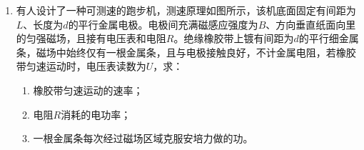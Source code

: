 \documentclass[\gkver]{gaokaozhenti}
\begin{document}
\begin{enumerate}
{$a=\frac{mg-\mu(M+m')g}{M+m+m'}=\frac{mg-\mu(M+m+m')g+\mu mg}{M+m+m'}=\frac{(1+\mu)g}{M+m+m'}m-\mu g$

若要求 $a$ 是 $m$ 的一次函数必须使 $\frac{(1+\mu)g}{M+m+m'}$ 不变，即使 $m+m'$ 不变，在增大 $m$ 时等量减小 $m'$，所以实验中应将从托盘中取出的砝码置于滑块上。

③将 $\frac{(1+\mu)g}{M+m+m'}$ 取为 $k$，有 $k=\frac{a_{1}+\mu g}{m_{1}}=\frac{a_{2}+\mu g}{m_{2}}$，在图像上取两点将坐标代入解得 $\mu=0.23$（在 0.21 到 0.25 之间是正确的）。
}

\item
有人设计了一种可测速的跑步机，测速原理如图所示，该机底面固定有间距为$L$、长度为$d$的平行金属电极。电极间充满磁感应强度为$B$、方向垂直纸面向里的匀强磁场，且接有电压表和电阻$R$。绝缘橡胶带上镀有间距为$d$的平行细金属条，磁场中始终仅有一根金属条，且与电极接触良好，不计金属电阻，若橡胶带匀速运动时，电压表读数为$U$，求：
\begin{enumerate}
	\item
	橡胶带匀速运动的速率；
	\item
	电阻$R$消耗的电功率；
	\item
	一根金属条每次经过磁场区域克服安培力做的功。
\end{enumerate}


\end{enumerate}
\end{document}
